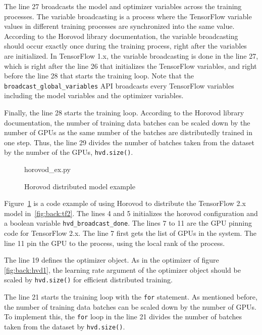 The line 27 broadcasts the model and optimizer variables across the training
processes.
The variable broadcasting is a process where the TensorFlow 
variable values in different training processes are synchronized into
the same value.
According to the Horovod library documentation, the variable broadcasting
should occur exactly once during the training process,
right after the variables are initialized.
In TensorFlow 1.x, the variable broadcasting is done in the line 27,
which is right after the line 26 that initializes the TensorFlow variables,
and right before the line 28 that starts the training loop.
Note that the {\tt broadcast\_global\_variables} API broadcasts every
TensorFlow variables including the model variables and the optimizer
variables.

Finally, the line 28 starts the training loop.
According to the Horovod library documentation, the number of training data
batches can be scaled down by the number of GPUs as the same number of
the batches are distributedly trained in one step.
Thus, the line 29 divides the number of batches taken from the dataset
by the number of the GPUs, {\tt hvd.size()}.


\begin{figure}[ht!]
 
{horovod_ex.py}
  \caption{Horovod distributed model example}
\label{fig:back:hvd2} 
\end{figure}

Figure~\ref{fig:back:hvd2} is a code example of using Horovod to distribute
the TensorFlow 2.x model in~\ref{fig:back:tf2}.
The lines 4 and 5 initializes the horovod configuration and a boolean variable
{\tt hvd\_broadcast\_done}.
The lines 7 to 11 are the GPU pinning code for TensorFlow 2.x. 
The line 7 first gets the list of GPUs in the system.
The line 11 pin the GPU to the process, using the local rank of the process.

The line 19 defines the optimizer object.
As in the optimizer of figure \ref{fig:back:hvd1}, 
the learning rate argument of the optimizer object 
should be scaled by {\tt hvd.size()} for efficient distributed training. 

The line 21 starts the training loop with the {\tt for} statement.
As mentioned before, the number of training data batches can be
scaled down by the number of GPUs.
To implement this, the {\tt for} loop in the line 21
divides the number of batches taken from the dataset by {\tt hvd.size()}.

